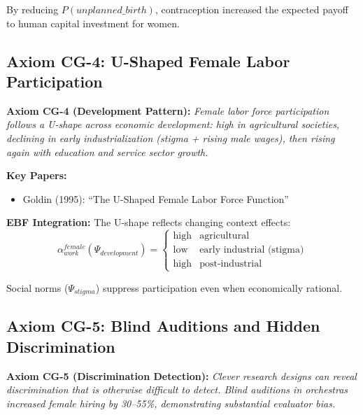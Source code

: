 By reducing $P(unplanned\_birth)$, contraception increased the expected payoff
to human capital investment for women.

\subsection{Axiom CG-4: U-Shaped Female Labor Participation}

\begin{tcolorbox}[colback=blue!5!white, colframe=blue!75!black]
\textbf{Axiom CG-4 (Development Pattern):}
\textit{Female labor force participation follows a U-shape across economic
development: high in agricultural societies, declining in early
industrialization (stigma + rising male wages), then rising again with
education and service sector growth.}
\end{tcolorbox}

\textbf{Key Papers:}
\begin{itemize}[nosep]
    \item Goldin (1995): ``The U-Shaped Female Labor Force Function''
\end{itemize}

\textbf{EBF Integration:}
The U-shape reflects changing context effects:
\begin{equation}
\alpha^{female}_{work}(\Psi_{development}) = \begin{cases}
\text{high} & \text{agricultural} \\
\text{low} & \text{early industrial (stigma)} \\
\text{high} & \text{post-industrial}
\end{cases}
\end{equation}

Social norms ($\Psi_{stigma}$) suppress participation even when economically
rational.

\subsection{Axiom CG-5: Blind Auditions and Hidden Discrimination}

\begin{tcolorbox}[colback=blue!5!white, colframe=blue!75!black]
\textbf{Axiom CG-5 (Discrimination Detection):}
\textit{Clever research designs can reveal discrimination that is otherwise
difficult to detect. Blind auditions in orchestras increased female hiring
by 30--55\%, demonstrating substantial evaluator bias.}
\end{tcolorbox}


